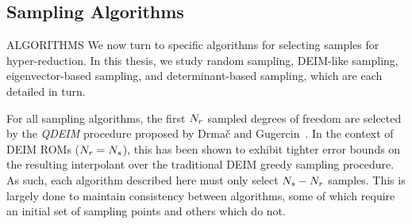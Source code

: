 \subsection{Sampling Algorithms}
%
{\color{red} ALGORITHMS}
We now turn to specific algorithms for selecting samples for hyper-reduction. In this thesis, we study random sampling, DEIM-like sampling, eigenvector-based sampling, and determinant-based sampling, which are each detailed in turn.

For all sampling algorithms, the first $N_r$ sampled degrees of freedom are selected by the \textit{QDEIM} procedure proposed by Drma\v{c} and Gugercin~\cite{Drmac2016}. In the context of DEIM ROMs ($N_r = N_s$), this has been shown to exhibit tighter error bounds on the resulting interpolant over the traditional DEIM greedy sampling procedure. As such, each algorithm described here must only select $N_s - N_r$ samples. This is largely done to maintain consistency between algorithms, some of which require an initial set of sampling points and others which do not.


